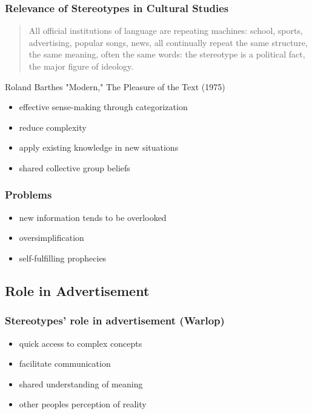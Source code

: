 \documentclass{beamer}
\begin{document}
\begin{frame}
 \frametitle{Relevance of Stereotypes in Cultural Studies}
 \begin{quotation} 
   All official institutions of language are repeating machines: school, sports, advertising, popular songs, news, all continually repeat the same structure, the same meaning, often the same words: the stereotype is a political fact, the major figure of ideology.\\
 \end{quotation}
 Roland Barthes "Modern," The Pleasure of the Text (1975)
\end{frame}

\begin{frame}
 \begin{itemize}
 \frametitle{Benefits}
  \item effective sense-making through categorization
  \item reduce complexity
  \item apply existing knowledge in new situations
  \item shared collective group beliefs
 \end{itemize}
\end{frame}

\begin{frame}
 \frametitle{Problems}
 \begin{itemize}
  \item new information tends to be overlooked
  \item oversimplification
  \item self-fulfilling prophecies
 \end{itemize}
\end{frame}

\subsection{Role in Advertisement}

\begin{frame}
 \frametitle{Stereotypes' role in advertisement (Warlop)}
 \begin{itemize}
  \item quick access to complex concepts
  \item facilitate communication
  \item shared understanding of meaning
  \item other peoples perception of reality
 \end{itemize}
\end{frame}
\end{document}
